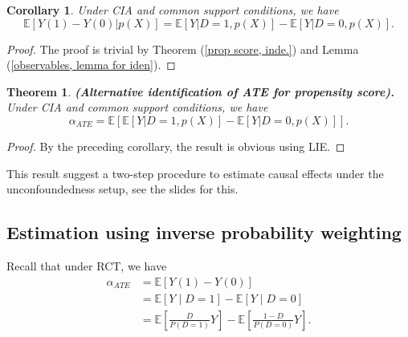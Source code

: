 \documentclass[11pt,a4paper]{amsart}
\theoremstyle{plain}
\newtheorem{theorem}{Theorem}
\newtheorem{corollary}{Corollary}
\theoremstyle{definition}
\begin{document}
	\begin{corollary}
		Under CIA and common support conditions, we have 
		\[	\mathbb{E}[Y(1)-Y(0)|p(X)] = \mathbb{E}[Y|D=1, p(X)] - \mathbb{E}[Y|D=0, p(X)]. 	\]
	\end{corollary}
	\begin{proof}
		The proof is trivial by Theorem (\ref{prop score, inde.}) and Lemma (\ref{observables, lemma for iden}).
	\end{proof}

	\begin{theorem}
		\textbf{(Alternative identification of ATE for propensity score).} Under CIA and common support conditions, we have 
		\[	\alpha_{ATE} = \mathbb{E}\left[\mathbb{E}[Y|D=1, p(X)] - \mathbb{E}[Y|D=0, p(X)]\right].	\]
	\end{theorem}
	\begin{proof}
		By the preceding corollary, the result is obvious using LIE. 
	\end{proof}
	This result suggest a two-step procedure to estimate causal effects under the unconfoundedness setup, see the slides for this. 
	
\subsection{Estimation using inverse probability weighting}\hfill\par 
	Recall that under RCT, we have 
	\[	\begin{aligned}
	\alpha_{A T E} &=\mathbb{E}[Y(1)-Y(0)] \\
	&=\mathbb{E}[Y \mid D=1]-\mathbb{E}[Y \mid D= 0] \\
	&=\mathbb{E}\left[\frac{D}{P(D=1)}Y\right]-\mathbb{E}\left[\frac{1-D}{P(D=0)}Y\right].
	\end{aligned}	\]
	
\end{document}

